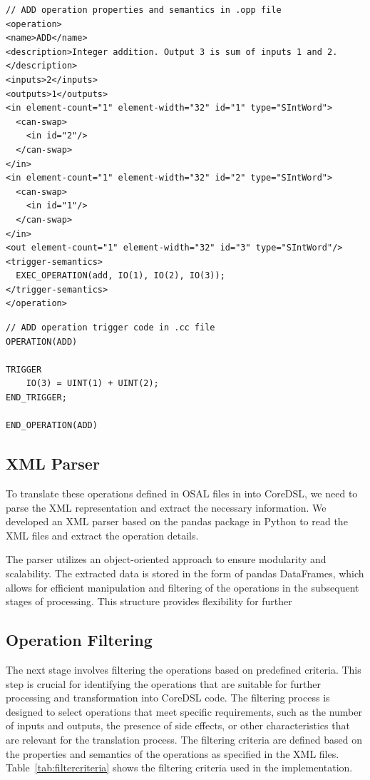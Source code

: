 \begin{lstlisting}[caption={.opp file Example \cite{openasipcode}},captionpos=b]
// ADD operation properties and semantics in .opp file
<operation>
<name>ADD</name>
<description>Integer addition. Output 3 is sum of inputs 1 and 2.</description>
<inputs>2</inputs>
<outputs>1</outputs>
<in element-count="1" element-width="32" id="1" type="SIntWord">
  <can-swap>
    <in id="2"/>
  </can-swap>
</in>
<in element-count="1" element-width="32" id="2" type="SIntWord">
  <can-swap>
    <in id="1"/>
  </can-swap>
</in>
<out element-count="1" element-width="32" id="3" type="SIntWord"/>
<trigger-semantics>
  EXEC_OPERATION(add, IO(1), IO(2), IO(3));
</trigger-semantics>
</operation>
\end{lstlisting}

\begin{lstlisting}[caption={.cc file Example \cite{openasipcode}},captionpos=b]
// ADD operation trigger code in .cc file
OPERATION(ADD)

TRIGGER
    IO(3) = UINT(1) + UINT(2);
END_TRIGGER;

END_OPERATION(ADD)
\end{lstlisting}

\subsection{XML Parser}

To translate these operations defined in OSAL files in into CoreDSL, we need to parse the XML representation and extract the necessary information. We developed an XML parser based on the pandas package in Python to read the XML files and extract the operation details.

The parser utilizes an object-oriented approach to ensure modularity and scalability. The extracted data is stored in the form of pandas DataFrames, which allows for efficient manipulation and filtering of the operations in the subsequent stages of processing. This structure provides flexibility for further

\subsection{Operation Filtering}

The next stage involves filtering the operations based on predefined criteria. This step is crucial for identifying the operations that are suitable for further processing and transformation into CoreDSL code. The filtering process is designed to select operations that meet specific requirements, such as the number of inputs and outputs, the presence of side effects, or other characteristics that are relevant for the translation process. The filtering criteria are defined based on the properties and semantics of the operations as specified in the XML files. Table~\ref{tab:filtercriteria} shows the filtering criteria used in the implementation.

